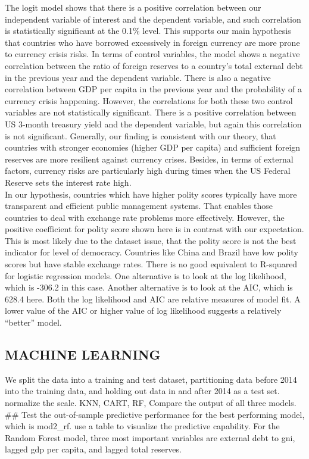 \documentclass[12pt,]{article}
\begin{document}
The logit model shows that there is a positive correlation between our
independent variable of interest and the dependent variable, and such
correlation is statistically significant at the 0.1\% level. This
supports our main hypothesis that countries who have borrowed
excessively in foreign currency are more prone to currency crisis risks.
In terms of control variables, the model shows a negative correlation
between the ratio of foreign reserves to a country's total external debt
in the previous year and the dependent variable. There is also a
negative correlation between GDP per capita in the previous year and the
probability of a currency crisis happening. However, the correlations
for both these two control variables are not statistically significant.
There is a positive correlation between US 3-month treasury yield and
the dependent variable, but again this correlation is not significant.
Generally, our finding is consistent with our theory, that countries
with stronger economies (higher GDP per capita) and sufficient foreign
reserves are more resilient against currency crises. Besides, in terms
of external factors, currency risks are particularly high during times
when the US Federal Reserve sets the interest rate high.\\
In our hypothesis, countries which have higher polity scores typically
have more transparent and efficient public management systems. That
enables those countries to deal with exchange rate problems more
effectively. However, the positive coefficient for polity score shown
here is in contrast with our expectation. This is most likely due to the
dataset issue, that the polity score is not the best indicator for level
of democracy. Countries like China and Brazil have low polity scores but
have stable exchange rates. There is no good equivalent to R-squared for
logistic regression models. One alternative is to look at the log
likelihood, which is -306.2 in this case. Another alternative is to look
at the AIC, which is 628.4 here. Both the log likelihood and AIC are
relative measures of model fit. A lower value of the AIC or higher value
of log likelihood suggests a relatively ``better'' model.

\subsection{MACHINE LEARNING}\label{machine-learning}

We split the data into a training and test dataset, partitioning data
before 2014 into the training data, and holding out data in and after
2014 as a test set. normalize the scale. KNN, CART, RF, Compare the
output of all three models. \#\# Test the out-of-sample predictive
performance for the best performing model, which is mod2\_rf. use a
table to visualize the predictive capability. For the Random Forest
model, three most important variables are external debt to gni, lagged
gdp per capita, and lagged total reserves.
\end{document}
